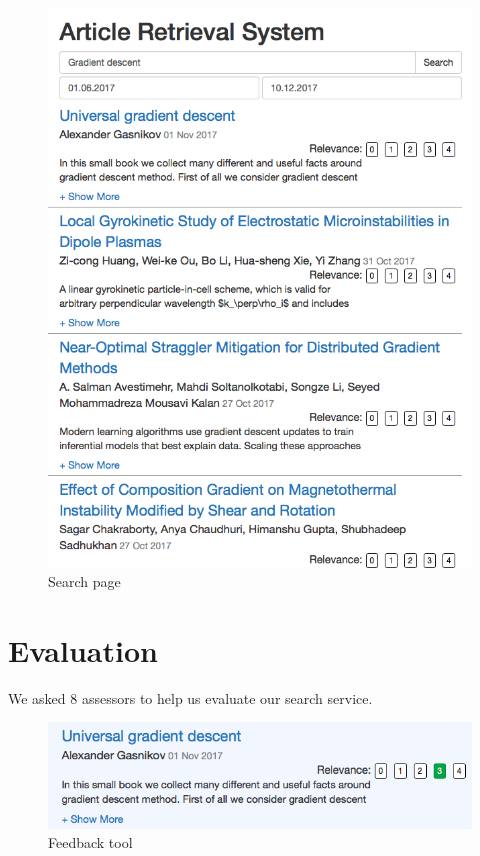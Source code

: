 \begin{figure}
  \includegraphics[width=\linewidth]{screenshot_1.png}
  \caption{Search page}
  \label{fig:search_page}
\end{figure}

\section{Evaluation}

We asked 8 assessors to help us evaluate our search service. 

\begin{figure}
  \includegraphics[width=\linewidth]{screenshot_2.png}
  \caption{Feedback tool}
  \label{fig:search_page}
\end{figure}

